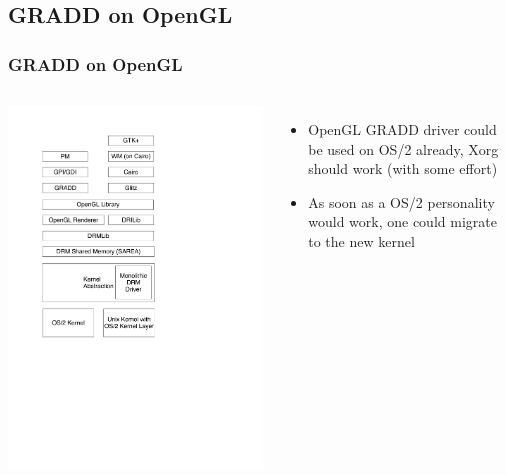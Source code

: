 \documentclass[handout]{beamer}
\begin{document}
\subsection{GRADD on OpenGL}
\begin{frame}
\frametitle{GRADD on OpenGL}
	\begin{columns}
    		\column{3cm}
			\includegraphics[scale=0.3]{ogl-gradd.pdf}
		\column{6cm}
			\begin{itemize}
              \item OpenGL GRADD driver could be  used on OS/2 already, Xorg should work (with some effort)
              \item As soon as a OS/2 personality would work, one could migrate to the new kernel
            \end{itemize}
  	\end{columns}
\end{frame}
\end{document}
